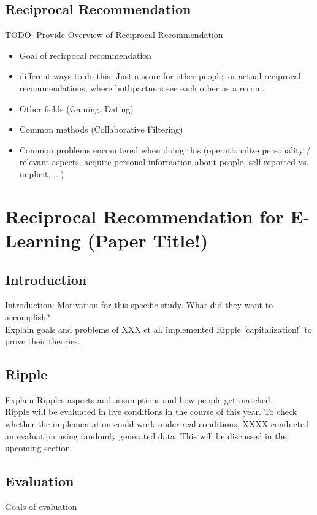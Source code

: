 \documentclass[nochapterpage,bigchapter,linedtoc,longdoc,colorback,accentcolor=tud3b]{tudreport}
\begin{document}
\section{Reciprocal Recommendation}
TODO: Provide Overview of Reciprocal Recommendation\\
\begin{itemize}
	\item Goal of recirpocal recommendation
	\item different ways to do this: Just a score for other people, or actual reciprocal recommendations, where bothpartners see each other as a recom.
	\item Other fields (Gaming, Dating)
	\item Common methods (Collaborative Filtering)
	\item Common problems encountered when doing this (operationalize personality / relevant aspects, acquire personal information about people, self-reported vs. implicit, ...)
\end{itemize}

\chapter{Reciprocal Recommendation for E-Learning (Paper Title!)}
\section{Introduction}
Introduction: Motivation for this specific study. What did they want to accomplish?\\
Explain goals and problems of 
XXX et al. implemented Ripple [capitalization!] to prove their theories. 
\section{Ripple}
Explain Ripples aspects and assumptions and how people get matched.\\
Ripple will be evaluated in live conditions in the course of this year. To check whether the implementation could work under real conditions, XXXX conducted an evaluation using randomly generated data. This will be discussed in the upcoming section\\
\section{Evaluation}
Goals of evaluation\\
\end{document}
